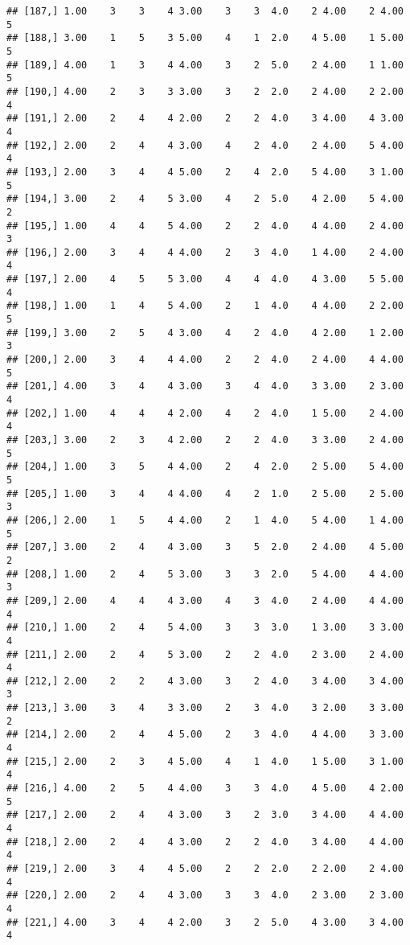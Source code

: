 \documentclass[]{article}
\begin{document}
\begin{verbatim}
## [187,] 1.00    3    3    4 3.00    3    3  4.0    2 4.00    2 4.00    5
## [188,] 3.00    1    5    3 5.00    4    1  2.0    4 5.00    1 5.00    5
## [189,] 4.00    1    3    4 4.00    3    2  5.0    2 4.00    1 1.00    5
## [190,] 4.00    2    3    3 3.00    3    2  2.0    2 4.00    2 2.00    4
## [191,] 2.00    2    4    4 2.00    2    2  4.0    3 4.00    4 3.00    4
## [192,] 2.00    2    4    4 3.00    4    2  4.0    2 4.00    5 4.00    4
## [193,] 2.00    3    4    4 5.00    2    4  2.0    5 4.00    3 1.00    5
## [194,] 3.00    2    4    5 3.00    4    2  5.0    4 2.00    5 4.00    2
## [195,] 1.00    4    4    5 4.00    2    2  4.0    4 4.00    2 4.00    3
## [196,] 2.00    3    4    4 4.00    2    3  4.0    1 4.00    2 4.00    4
## [197,] 2.00    4    5    5 3.00    4    4  4.0    4 3.00    5 5.00    4
## [198,] 1.00    1    4    5 4.00    2    1  4.0    4 4.00    2 2.00    5
## [199,] 3.00    2    5    4 3.00    4    2  4.0    4 2.00    1 2.00    3
## [200,] 2.00    3    4    4 4.00    2    2  4.0    2 4.00    4 4.00    5
## [201,] 4.00    3    4    4 3.00    3    4  4.0    3 3.00    2 3.00    4
## [202,] 1.00    4    4    4 2.00    4    2  4.0    1 5.00    2 4.00    4
## [203,] 3.00    2    3    4 2.00    2    2  4.0    3 3.00    2 4.00    5
## [204,] 1.00    3    5    4 4.00    2    4  2.0    2 5.00    5 4.00    5
## [205,] 1.00    3    4    4 4.00    4    2  1.0    2 5.00    2 5.00    3
## [206,] 2.00    1    5    4 4.00    2    1  4.0    5 4.00    1 4.00    5
## [207,] 3.00    2    4    4 3.00    3    5  2.0    2 4.00    4 5.00    2
## [208,] 1.00    2    4    5 3.00    3    3  2.0    5 4.00    4 4.00    3
## [209,] 2.00    4    4    4 3.00    4    3  4.0    2 4.00    4 4.00    4
## [210,] 1.00    2    4    5 4.00    3    3  3.0    1 3.00    3 3.00    4
## [211,] 2.00    2    4    5 3.00    2    2  4.0    2 3.00    2 4.00    4
## [212,] 2.00    2    2    4 3.00    3    2  4.0    3 4.00    3 4.00    3
## [213,] 3.00    3    4    3 3.00    2    3  4.0    3 2.00    3 3.00    2
## [214,] 2.00    2    4    4 5.00    2    3  4.0    4 4.00    3 3.00    4
## [215,] 2.00    2    3    4 5.00    4    1  4.0    1 5.00    3 1.00    4
## [216,] 4.00    2    5    4 4.00    3    3  4.0    4 5.00    4 2.00    5
## [217,] 2.00    2    4    4 3.00    3    2  3.0    3 4.00    4 4.00    4
## [218,] 2.00    2    4    4 3.00    2    2  4.0    3 4.00    4 4.00    4
## [219,] 2.00    3    4    4 5.00    2    2  2.0    2 2.00    2 4.00    4
## [220,] 2.00    2    4    4 3.00    3    3  4.0    2 3.00    2 3.00    4
## [221,] 4.00    3    4    4 2.00    3    2  5.0    4 3.00    3 4.00    4

\end{verbatim}
\end{document}
